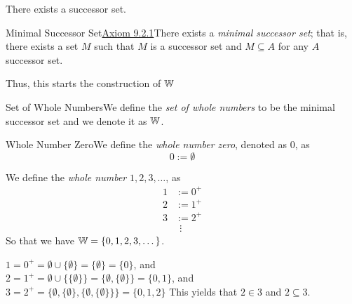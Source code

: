            \begin{axiom}
                {}There exists a successor set.
            \end{axiom}

            \begin{corollary}
                {Minimal Successor Set}{\hyperref[ax:9.2.1]{Axiom 9.2.1}}There exists a \textit{minimal successor set}; that is, there exists a set \(M\) such that \(M\) is a successor set and \(M\subseteq A\) for any \(A\) successor set.
            \end{corollary}

            Thus, this starts the construction of \(\mathbb{W}\)

            \begin{definition}
                {Set of Whole Numbers}We define the \textit{set of whole numbers} to be the minimal successor set and we denote it as \(\mathbb{W}\).
            \end{definition}


            \begin{definition}
                {Whole Number Zero}We define the \textit{whole number zero}, denoted as \(0\), as \[0 := \emptyset\]
            \end{definition}


            \begin{definition}
                We define the \textit{whole number} \(1,2,3,\dots\), as 
                \begin{align*}
                    1 &:= 0^+ \\
                    2 &:= 1^+ \\
                    3 &:= 2^+ \\
                    & \ \ \vdots
                \end{align*}
                So that we have \(\mathbb{W} = \{0,1,2,3,\dots\}\).
            \end{definition}

        \begin{example}
            \(1 = 0^+ = \emptyset \cup \{\emptyset\} = \{\emptyset\} = \{0\}\), and \\
            \(2 = 1^+ = \emptyset \cup \{\{\emptyset\}\} = \{\emptyset, \{\emptyset\}\} = \{0,1\}\), and \\
            \(3 = 2^+ = \{\emptyset, \{\emptyset\}, \{\emptyset, \{\emptyset\}\}\} = \{0,1,2\}\)
            This yields that \(2\in 3\) and \(2\subseteq 3\).
        \end{example}


